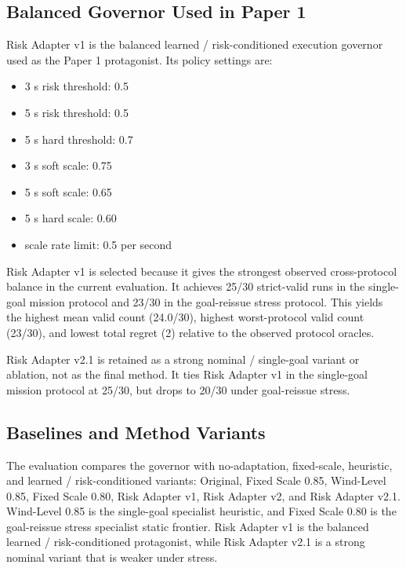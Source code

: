 \subsection{Balanced Governor Used in Paper 1}

Risk Adapter v1 is the balanced learned / risk-conditioned execution governor
used as the Paper 1 protagonist. Its policy settings are:

\begin{itemize}
  \item 3 s risk threshold: 0.5
  \item 5 s risk threshold: 0.5
  \item 5 s hard threshold: 0.7
  \item 3 s soft scale: 0.75
  \item 5 s soft scale: 0.65
  \item 5 s hard scale: 0.60
  \item scale rate limit: 0.5 per second
\end{itemize}

Risk Adapter v1 is selected because it gives the strongest observed
cross-protocol balance in the current evaluation. It achieves 25/30
strict-valid runs in the single-goal mission protocol and 23/30 in the
goal-reissue stress protocol. This yields the highest mean valid count
(24.0/30), highest worst-protocol valid count (23/30), and lowest total regret
(2) relative to the observed protocol oracles.

Risk Adapter v2.1 is retained as a strong nominal / single-goal variant or
ablation, not as the final method. It ties Risk Adapter v1 in the single-goal
mission protocol at 25/30, but drops to 20/30 under goal-reissue stress.

\subsection{Baselines and Method Variants}

The evaluation compares the governor with no-adaptation, fixed-scale,
heuristic, and learned / risk-conditioned variants: Original, Fixed Scale 0.85,
Wind-Level 0.85, Fixed Scale 0.80, Risk Adapter v1, Risk Adapter v2, and Risk
Adapter v2.1. Wind-Level 0.85 is the single-goal specialist heuristic, and
Fixed Scale 0.80 is the goal-reissue stress specialist static frontier. Risk
Adapter v1 is the balanced learned / risk-conditioned protagonist, while Risk
Adapter v2.1 is a strong nominal variant that is weaker under stress.

